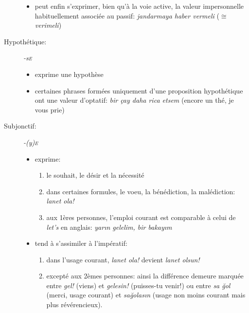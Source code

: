 \documentclass{cours}
\newcommand{\ug}{\u{g}}
\newcommand{\sce}{\textsc{e}}
\begin{document}
\begin{description}
\begin{itemize}
              \item peut enfin s'exprimer, bien qu'à la voie active, la valeur impersonnelle habituellement associée au passif: \textsl{jandarmaya haber vermeli} ($\cong$ \textsl{verimeli})
          \end{itemize}
    \item [Hypothétique:] \textsl{-s\sce}
          \begin{itemize}
              \item exprime une hypothèse
              \item certaines phrases formées uniquement d'une proposition hypothétique ont une valeur d'optatif: \textsl{bir çay daha rica etsem} (encore un thé, je vous prie)
          \end{itemize}
    \item [Subjonctif:] \textsl{-(y)\sce}
          \begin{itemize}
              \item exprime:
                    \begin{enumerate}
                        \item le souhait, le désir et la nécessité
                        \item dans certaines formules, le voeu, la bénédiction, la malédiction: \textsl{lanet ola!}
                        \item aux 1ères personnes, l'emploi courant est comparable à celui de \textsl{let's} en anglais: \textsl{yar\i n gelelim, bir bakay\i m}
                    \end{enumerate}
              \item tend à s'assimiler à l'impératif:
                    \begin{enumerate}
                        \item dans l'usage courant, \textsl{lanet ola!} devient \textsl{lanet olsun!}
                        \item excepté aux 2èmes personnes: ainsi la différence demeure marquée entre \textsl{gel!} (viens) et \textsl{gelesin!} (puisses-tu venir!) ou entre \textsl{sa \ug ol} (merci, usage courant) et \textsl{sa\ug olas\i n} (usage non moins courant mais plus révérencieux).
                    \end{enumerate}
          \end{itemize}
\end{description}
\end{document}
